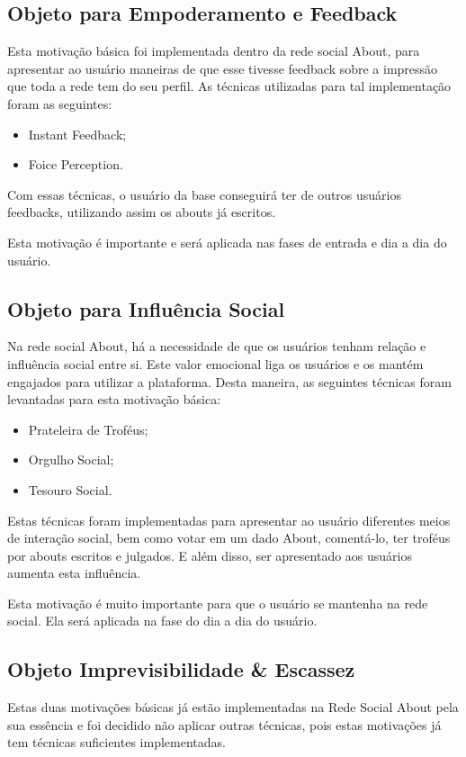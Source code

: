 \subsection{Objeto para Empoderamento e Feedback}
\label{sub:objeto_empoderamento_feedback}
Esta motivação básica foi implementada dentro da rede social About, para apresentar
ao usuário maneiras de que esse tivesse feedback sobre a impressão que toda a rede
tem do seu perfil. As técnicas utilizadas para tal implementação foram as seguintes:

\begin{itemize}
    \item Instant Feedback;
    \item Foice Perception.
\end{itemize}

Com essas técnicas, o usuário da base conseguirá ter de outros usuários feedbacks,
utilizando assim os abouts já escritos.

Esta motivação é importante e será aplicada nas fases de entrada e dia a dia do usuário.

\subsection{Objeto para Influência Social}
\label{sub:objeto_influencia_social}
Na rede social About, há a necessidade de que os usuários tenham relação e influência
social entre si. Este valor emocional liga os usuários e os mantém engajados para utilizar
a plataforma. Desta maneira, as seguintes técnicas foram levantadas para esta motivação
básica:

\begin{itemize}
    \item Prateleira de Troféus;
    \item Orgulho Social;
    \item Tesouro Social.
\end{itemize}

Estas técnicas foram implementadas para apresentar ao usuário diferentes meios de interação
social, bem como votar em um dado About, comentá-lo, ter troféus por abouts escritos e julgados. 
E além disso, ser apresentado aos usuários aumenta esta influência.

Esta motivação é muito importante para que o usuário se mantenha na rede social. Ela será aplicada
na fase do dia a dia do usuário.

\subsection{Objeto Imprevisibilidade \& Escassez}
\label{sub:objeto_imprevisibilidade}
Estas duas motivações básicas já estão implementadas na Rede Social About pela sua essência e foi
decidido não aplicar outras técnicas, pois estas motivações já tem técnicas suficientes implementadas.

